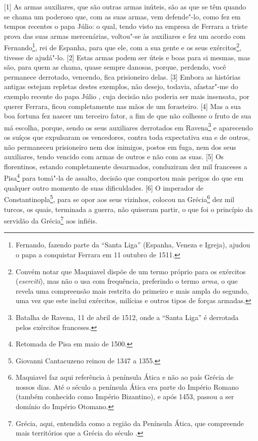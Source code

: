 {[}1{]} As armas auxiliares, que são outras armas inúteis, são as que se
têm quando se chama um poderoso que, com as suas armas, vem defende"-lo,
como fez em tempos recentes o papa Júlio: o qual, tendo visto na empresa
de Ferrara a triste prova das suas armas mercenárias, voltou"-se às
auxiliares e fez um acordo com Fernando\footnote{Fernando, fazendo parte
  da ``Santa Liga'' (Espanha, Veneza e Igreja), ajudou o papa a
  conquistar Ferrara em 11 outubro de 1511.}, rei de Espanha, para que
ele, com a sua gente e os seus exércitos\footnote{Convém notar que
  Maquiavel dispõe de um termo próprio para os exércitos
  (\emph{eserciti}), mas não o usa com frequência, preferindo o termo
  \emph{arma}, o que revela uma compreensão mais restrita do primeiro e
  mais ampla do segundo, uma vez que este inclui exércitos, milícias e
  outros tipos de forças armadas.}, tivesse de ajudá"-lo. {[}2{]} Estas
armas podem ser úteis e boas para si mesmas, mas são, para quem as
chama, quase sempre danosas, porque, perdendo, você permanece derrotado,
vencendo, fica prisioneiro delas. {[}3{]} Embora as histórias antigas
estejam repletas destes exemplos, não desejo, todavia, afastar"-me do
exemplo recente do papa Júlio , cuja decisão não poderia ser mais
insensata, por querer Ferrara, ficou completamente nas mãos de um
forasteiro. {[}4{]} Mas a sua boa fortuna fez nascer um terceiro fator,
a fim de que não colhesse o fruto de sua má escolha, porque, sendo os
seus auxiliares derrotados em Ravena\footnote{Batalha de Ravena, 11 de
  abril de 1512, onde a ``Santa Liga'' é derrotada pelos exércitos
  franceses.} e aparecendo os suíços que expulsaram os vencedores,
contra toda expectativa sua e de outros, não permaneceu prisioneiro nem
dos inimigos, postos em fuga, nem dos seus auxiliares, tendo vencido com
armas de outros e não com as suas. {[}5{]} Os florentinos, estando
completamente desarmados, conduziram dez mil franceses a Pisa\footnote{Retomada
  de Pisa em maio de 1500.} para tomá"-la de assalto, decisão que
comportou mais perigos do que em qualquer outro momento de suas
dificuldades. {[}6{]} O imperador de Constantinopla\footnote{Giovanni 
  Cantacuzeno reinou de 1347 a 1355.}, para se opor aos seus vizinhos,
colocou na Grécia\footnote{Maquiavel faz aqui referência à península Ática e não ao país Grécia de nossos dias. Até o século  a península Ática era parte do Império Romano (também conhecido como Império Bizantino), e após 1453, passou a ser domínio do Império Otomano.}
dez mil turcos, os quais, terminada a guerra, não quiseram partir, o que
foi o princípio da servidão da Grécia\footnote{Grécia, aqui, entendida
  como a região da Península Ática, que compreende mais territórios que
  a Grécia do século .} aos infiéis.

